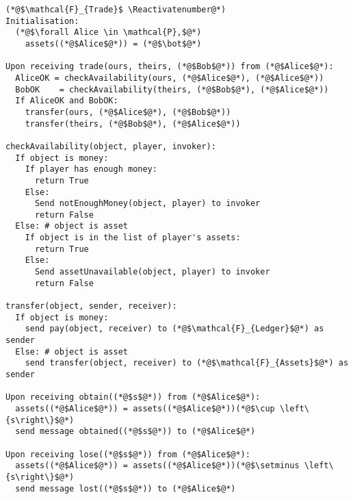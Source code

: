 \Suppressnumber
\begin{lstlisting}[label=tradefunc, style=numbers]
(*@$\mathcal{F}_{Trade}$ \Reactivatenumber@*)
Initialisation:
  (*@$\forall Alice \in \mathcal{P},$@*)
    assets((*@$Alice$@*)) = (*@$\bot$@*)

Upon receiving trade(ours, theirs, (*@$Bob$@*)) from (*@$Alice$@*):
  AliceOK = checkAvailability(ours, (*@$Alice$@*), (*@$Alice$@*))
  BobOK    = checkAvailability(theirs, (*@$Bob$@*), (*@$Alice$@*))
  If AliceOK and BobOK:
    transfer(ours, (*@$Alice$@*), (*@$Bob$@*))
    transfer(theirs, (*@$Bob$@*), (*@$Alice$@*))

checkAvailability(object, player, invoker):
  If object is money:
    If player has enough money:
      return True
    Else:
      Send notEnoughMoney(object, player) to invoker
      return False
  Else: # object is asset
    If object is in the list of player's assets:
      return True
    Else:
      Send assetUnavailable(object, player) to invoker
      return False

transfer(object, sender, receiver):
  If object is money:
    send pay(object, receiver) to (*@$\mathcal{F}_{Ledger}$@*) as sender
  Else: # object is asset
    send transfer(object, receiver) to (*@$\mathcal{F}_{Assets}$@*) as sender

Upon receiving obtain((*@$s$@*)) from (*@$Alice$@*):
  assets((*@$Alice$@*)) = assets((*@$Alice$@*))(*@$\cup \left\{s\right\}$@*)
  send message obtained((*@$s$@*)) to (*@$Alice$@*)

Upon receiving lose((*@$s$@*)) from (*@$Alice$@*):
  assets((*@$Alice$@*)) = assets((*@$Alice$@*))(*@$\setminus \left\{s\right\}$@*)
  send message lost((*@$s$@*)) to (*@$Alice$@*)
\end{lstlisting}

